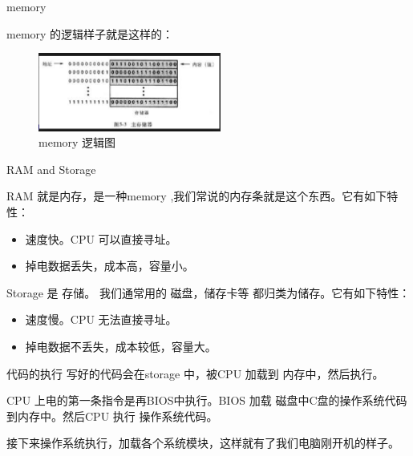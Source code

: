 \documentclass[10pt]{beamer}
\begin{document}
\begin{frame}[fragile]{memory}

memory 的逻辑样子就是这样的：
\begin{figure}[htbp]
\begin{center}
\includegraphics[width=6cm]{img/memory}
\caption{memory 逻辑图}
\label{memory}
\end{center}
\vspace{-0.5em}
\end{figure}

\end{frame}


\begin{frame}[fragile]{RAM and Storage }

RAM 就是内存，是一种memory ,我们常说的内存条就是这个东西。它有如下特性：
\begin{itemize}
\item 速度快。CPU 可以直接寻址。
\item 掉电数据丢失，成本高，容量小。
\end{itemize}

Storage 是 存储。 我们通常用的 磁盘，储存卡等 都归类为储存。它有如下特性：
\begin{itemize}
\item 速度慢。CPU 无法直接寻址。
\item 掉电数据不丢失，成本较低，容量大。
\end{itemize}

\end{frame}



\begin{frame}[fragile]{代码的执行}
写好的代码会在storage 中，被CPU 加载到 内存中，然后执行。

CPU 上电的第一条指令是再BIOS中执行。BIOS 加载 磁盘中C盘的操作系统代码到内存中。然后CPU 执行
操作系统代码。

接下来操作系统执行，加载各个系统模块，这样就有了我们电脑刚开机的样子。


\end{frame}
\end{document}
